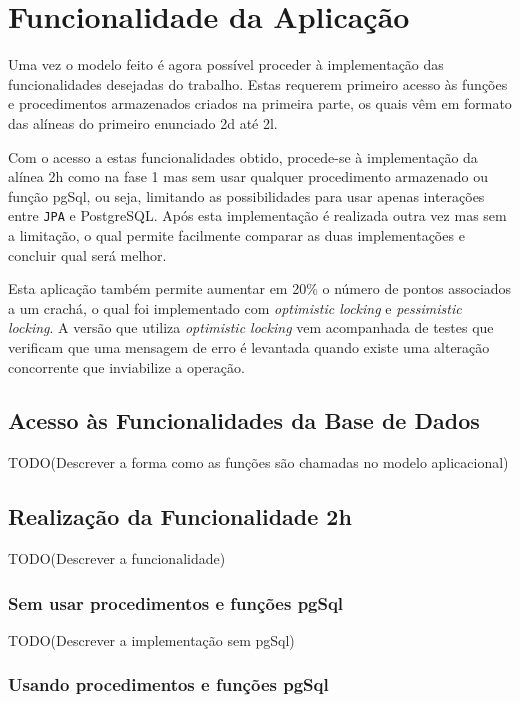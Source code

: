 %
%
\chapter{Funcionalidade da Aplicação} \label{cap3}

Uma vez o modelo feito é agora possível proceder à implementação das funcionalidades desejadas do trabalho. Estas requerem primeiro acesso às funções e procedimentos
armazenados criados na primeira parte, os quais vêm em formato das alíneas do primeiro enunciado 2d até 2l.

Com o acesso a estas funcionalidades obtido, procede-se à implementação da alínea 2h como na fase 1 mas sem usar qualquer procedimento armazenado ou função pgSql,
ou seja, limitando as possibilidades para usar apenas interações entre \texttt{JPA} e PostgreSQL. Após esta implementação é realizada outra vez mas sem a limitação,
o qual permite facilmente comparar as duas implementações e concluir qual será melhor.

Esta aplicação também permite aumentar em 20\% o número de pontos associados a um crachá, o qual foi implementado com \textit{optimistic locking} e \textit{pessimistic
locking}. A versão que utiliza \textit{optimistic locking} vem acompanhada de testes que verificam que uma mensagem de erro é levantada quando existe uma alteração
concorrente que inviabilize a operação.

%
%
\section{Acesso às Funcionalidades da Base de Dados} \label{sec31}

TODO(Descrever a forma como as funções são chamadas no modelo aplicacional)

%
%
\section{Realização da Funcionalidade 2h} \label{sec32}

TODO(Descrever a funcionalidade)

%
%
\subsection{Sem usar procedimentos e funções pgSql} \label{sec321}

TODO(Descrever a implementação sem pgSql)

%
%
\subsection{Usando procedimentos e funções pgSql} \label{sec322}

